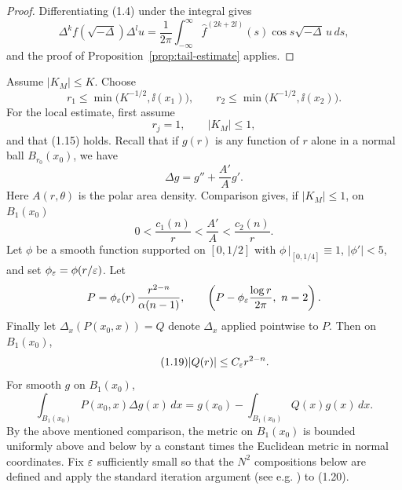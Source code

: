 \begin{proof}
\sketch Differentiating (1.4) under the integral gives
\begin{equation}\tag{1.14}
\Delta^k f(\sqrt{-\Delta}) \Delta^l u
= \frac{1}{2\pi} \int_{-\infty}^{\infty} \hat{f}^{(2k+2l)}(s)\cos s\sqrt{-\Delta}\,u\,ds,
\end{equation}
and the proof of Proposition~\ref{prop:tail-estimate} applies.
\end{proof}

Assume $\lvert K_M\rvert\leq K$. Choose
\begin{equation}\tag{1.15}
 r_1\le \min\bigl(K^{-1/2},\ii(x_1)\bigr),\qquad
 r_2\le \min\bigl(K^{-1/2},\ii(x_2)\bigr).
\end{equation}
For the local estimate, first assume
\begin{equation}\tag{1.16}
 r_j=1,\qquad \lvert K_M\rvert \leq 1,
\end{equation}
and that (1.15) holds. Recall that if $g(r)$ is any function of $r$ alone in a
normal ball $B_{r_0}(x_0)$, we have
\begin{equation}\tag{1.17}
 \Delta g = g'' + \frac{A'}{A}g'.
\end{equation}
Here $A(r,\theta)$ is the polar area density. Comparison gives, if
$\lvert K_M\rvert\leq1$, on $B_1(x_0)$
\begin{equation}\tag{1.18}
 0<\frac{c_1(n)}{r}<\frac{A'}{A}<\frac{c_2(n)}{r}.
\end{equation}
Let $\phi$ be a smooth function supported on $[0,1/2]$ with
$\phi\,|_{[0,1/4]}\equiv 1$, $|\phi'|<5$, and set $\phi_{\varepsilon}=\phi(r/\varepsilon)$.
Let
\[
 P=\phi_{\varepsilon}(r)\,\frac{r^{2-n}}{\alpha(n-1)},\qquad
\left(P-\phi_{\varepsilon}\frac{\log r}{2\pi},\ n=2\right).
\]
Finally let $\Delta_x(P(x_0,x))=Q$ denote $\Delta_x$ applied pointwise to $P$.
Then on $B_1(x_0)$,
\begin{equation}\tag{1.19}
 |Q(r)|\le C_{\varepsilon}r^{2-n}.
\end{equation}
For smooth $g$ on $B_1(x_0)$,
\begin{equation}\tag{1.20}
 \int_{B_1(x_0)} P(x_0,x)\Delta g(x)\,dx = g(x_0)-\int_{B_1(x_0)} Q(x)g(x)\,dx.
\end{equation}
By the above mentioned comparison, the metric on $B_1(x_0)$ is bounded
uniformly above and below by a constant times the Euclidean metric in normal
coordinates. Fix $\varepsilon$ sufficiently small so that the $N^2$ compositions below
are defined and apply the standard iteration argument (see e.g. \cite{cgt-de-rham}) to (1.20).
